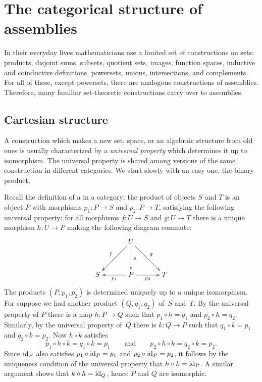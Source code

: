\section{The categorical structure of assemblies}
\label{sec:categ-structure}

In their everyday lives mathematicians use a limited set of
constructions on sets: products, disjoint sums, subsets, quotient
sets, images, function spaces, inductive and coinductive definitions,
powersets, unions, intersections, and complements. For all of these,
except powersets, there are analogous constructions of assemblies.
Therefore, many familiar set-theoretic constructions carry over to assemblies.

\subsection{Cartesian structure}
\label{sec:cartesian-structure}

A construction which makes a new set, space, or an algebraic structure
from old ones is usually characterized by a \emph{universal property}
which determines it up to isomorphism. The universal property is
shared among versions of the same construction in different
categories. We start slowly with an easy one, the binary product.

Recall the definition of a  in a category: the
product of objects $S$ and $T$ is an object $P$ with morphisms $p_1 :
P \to S$ and $p_2 : P \to T$, satisfying the following universal
property: for all morphisms $f : U \to S$ and $g : U \to T$ there is a
unique morphism $h : U \to P$ making the following diagram commute:
%
\begin{equation*}
  \xymatrix@+1em{
    &
    {U}
    \ar[ld]_{f}
    \ar[d]^h
    \ar[rd]^{g}
    &
    \\
    {S}
    &
    {P}
    \ar[l]^{p_1}
    \ar[r]_{p_2}
    &
    {T}
  }
\end{equation*}
%
The products $(P, p_1, p_2)$ is determined uniquely up to a unique
isomorphism. For suppose we had another product $(Q, q_1, q_2)$ of~$S$
and~$T$. By the universal property of $P$ there is a map $h : P \to Q$
such that $p_1 \circ h = q_1$ and $p_2 \circ h = q_2$. Similarly, by
the universal property of~$Q$ there is $k : Q \to P$ such that $q_1
\circ k = p_1$ and $q_2 \circ k = p_2$. Now $h \circ k$ satisfies
%
\begin{equation*}
  p_1 \circ h \circ k = q_1 \circ k = p_1
  \qquad\text{and}\qquad
  p_2 \circ h \circ k = q_2 \circ k = p_2.
\end{equation*}
%
Since $\id[P]$ also satisfies $p_1 \circ \id[P] = p_1$ and $p_2 \circ
\id[P] = p_2$, it follows by the uniqueness condition of the universal
property that $h \circ k = \id[P]$. A similar argument shows that $k
\circ h = \id[Q]$, hence $P$ and $Q$ are isomorphic.

